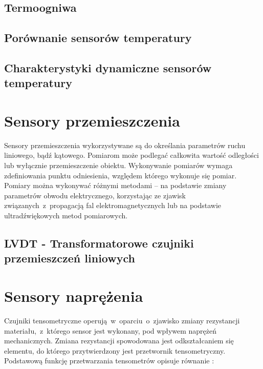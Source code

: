 \subsection{Termoogniwa}


\subsection{Porównanie sensorów temperatury}


\subsection{Charakterystyki dynamiczne sensorów temperatury}


\section{Sensory przemieszczenia}\label{sect:theory-lvdt}
Sensory przemieszczenia wykorzystywane są do określania parametrów ruchu liniowego, bądź kątowego.
Pomiarom może podlegać całkowita wartość odległości lub wyłącznie przemieszczenie obiektu.
Wykonywanie pomiarów wymaga zdefiniowania punktu odniesienia, względem którego wykonuje się pomiar.
Pomiary można wykonywać różnymi metodami -- na podstawie zmiany parametrów obwodu elektrycznego,
korzystając ze zjawisk związanych~z~propagacją fal elektromagnetycznych lub na podstawie
ultradźwiękowych metod pomiarowych.

\subsection{LVDT - Transformatorowe czujniki przemieszczeń liniowych}


\section{Sensory naprężenia}\label{sect:theory-strain} Czujniki tensometryczne
operują~w~oparciu~o~zjawisko zmiany rezystancji materiału,~z~którego sensor jest wykonany, pod
wpływem naprężeń mechanicznych. Zmiana rezystancji spowodowana jest odkształcaniem się elementu, do
którego przytwierdzony jest przetwornik tensometryczny. Podstawową funkcję przetwarzania tensometrów
opisuje równanie \cite{hoffman1989, milek2006}:

